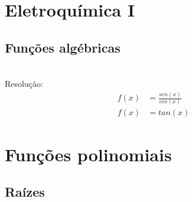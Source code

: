 \renewcommand{\sectionauthor}{Prof. Rafael Simões}

\begin{multicols*}{2}
        
    \section*{Eletroquímica I}
    \lipsum[1]

    \subsection*{Funções algébricas}
    \lipsum[1-2]
    
    \noindent \\Resolução:
    \begin{align}
        f(x) &= \frac{sen(x)}{cos(x)} \\[10pt]
        f(x) &= tan(x)
    \end{align}
    

    \newpage
    \section*{Funções polinomiais}
    \lipsum[1]

    \subsection*{Raízes}
    \lipsum[1-2]    
    
\end{multicols*}